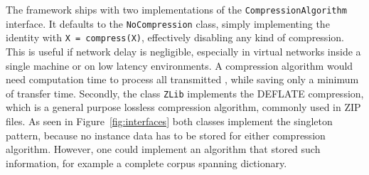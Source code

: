 The framework ships with two implementations of the \lstinline|CompressionAlgorithm| interface. It defaults to the \lstinline|NoCompression| class, simply implementing the identity with \lstinline|X = compress(X)|, effectively disabling any kind of compression. This is useful if network delay is negligible, especially in virtual networks inside a single machine or on low latency environments. A compression algorithm would need computation time to process all transmitted \cas{}, while saving only a minimum of transfer time. Secondly, the class \lstinline|ZLib| implements the DEFLATE compression, which is a general purpose lossless compression algorithm, commonly used in ZIP files. As seen in Figure~\ref{fig:interfaces} both classes implement the singleton pattern, because no instance data has to be stored for either compression algorithm. However, one could implement an algorithm that stored such information, for example a complete corpus spanning dictionary.

